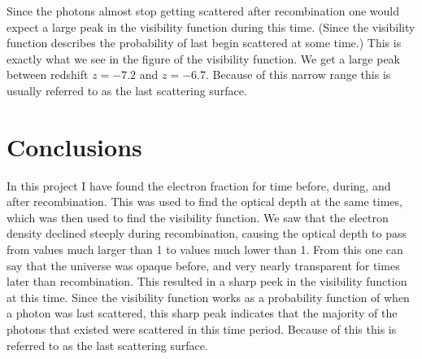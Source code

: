 \documentclass{aa}   %
\begin{document}
Since the photons almost stop getting scattered after recombination one would expect a large peak in the visibility function during this time. (Since the visibility function describes the probability of last begin scattered at some time.) This is exactly what we see in the figure of the visibility function. We get a large peak between redshift $z=-7.2$ and $z=-6.7$. Because of this narrow range this is usually referred to as the last scattering surface.
 

  

\section{Conclusions} \label{sec:conclusions}
In this project I have found the electron fraction for time before, during, and after recombination.
This was used to find the optical depth at the same times, which was then used to find the visibility function.
We saw that the electron density declined steeply during recombination, causing the optical depth to pass from values much larger than 1 to values much lower than 1. 
From this one can say that the universe was opaque before, and very nearly transparent for times later than recombination.
This resulted in a sharp peek in the visibility function at this time. Since the visibility function works as a probability function of when a photon was last scattered, this sharp peak indicates that the majority of the photons that existed were scattered in this time period. Because of this this is referred to as the last scattering surface. 
\end{document}
